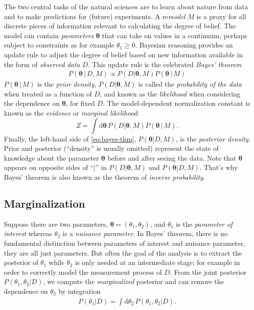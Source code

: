\documentclass[
12pt,
a4paper,
bibliography=totoc,
captions=nooneline, %
numbers=noenddot,
twoside]{scrbook}
\newcommand{\cond}{\,|\,}
\newcommand\rmdx[1]{\mbox{d}#1\,} %
\newcommand{\scath}{\theta} %
\newcommand{\vecth}{\bm{\theta}} %
\begin{document}
The two central tasks of the natural sciences are to learn about
nature from data and to make predictions for (future) experiments. A
re\emph{model} $M$ is a proxy for all discrete pieces of information relevant
to calculating the degree of belief. The model can contain \emph{parameters}
$\vecth$ that can take on values in a continuum, perhaps subject to
constraints as for example $\scath_1 \geq 0$. Bayesian reasoning
provides an update rule to adjust the degree of belief based on new
information available in the form of \emph{observed data} $D$. This update
rule is the celebrated \emph{Bayes' theorem}
\begin{align}
  \label{eq:bayes-thm}
  \boxed{  P(\vecth \cond D, M) \propto P(D|\vecth, M) P(\vecth \cond M)
  }
\end{align}
$P(\vecth \cond M)$ is the \emph{prior density}, $P(D|\vecth, M)$ is
called the \emph{probability of the data} when treated as a function
of $D$, and known as the \emph{likelihood} when considering the
dependence on $\vecth$, for fixed $D$. The model-dependent
normalization constant is known as the \emph{evidence} or
\emph{marginal likelihood}:
\begin{equation}
  \label{eq:evidence}
  Z = \int \rmdx{ \vecth} P(D|\vecth, M) P(\vecth \cond M).
\end{equation}
Finally, the left-hand side of \eqref{eq:bayes-thm}, $P(\vecth | D,
M)$, is the \emph{posterior density}. Prior and posterior (``density''
is usually omitted) represent the state of knowledge about the
parameter $\vecth$ before and after seeing the data. Note that
$\vecth$ appears on opposite sides of ``|'' in $P(D|\vecth,M)$ and
$P(\vecth|D,M)$. That's why Bayes' theorem is also known as the
theorem of \emph{inverse probability}.

\subsection{Marginalization} \label{sec:marginalization}

Suppose there are two parameters, $\vecth = (\scath_1, \scath_2)$, and
$\scath_1$ is the \emph{parameter of interest} whereas $\scath_2$ is a
\emph{nuisance parameter}. In Bayes' theorem, there is no fundamental
distinction between parameters of interest and nuisance parameter,
they are all just parameters. But often the goal of the analysis is to
extract the posterior of $\scath_1$ while $\scath_2$ is only needed at
an intermediate stage; for example in order to correctly model the
measurement process of $D$. From the joint posterior $P(\scath_1,
\scath_2 | D)$, we compute the \emph{marginalized} posterior and can
remove the dependence on $\scath_2$ by integration
\begin{align}
  \label{eq:marginal}
  P(\scath_1 | D) = \int \rmdx{\scath_2} P(\scath_1, \scath_2 | D).
\end{align}
\end{document}
